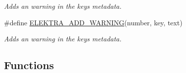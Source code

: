\begin{DoxyCompactItemize}
\begin{DoxyCompactList}\small\item\em Adds an warning in the keys metadata. \end{DoxyCompactList}\item 
\#define \hyperlink{group__plugin_ga3da3bdb0f41710adda9eee3d7adac9ff}{E\+L\+E\+K\+T\+R\+A\+\_\+\+A\+D\+D\+\_\+\+W\+A\+R\+N\+I\+N\+G}(number, key, text)
\begin{DoxyCompactList}\small\item\em Adds an warning in the keys metadata. \end{DoxyCompactList}\end{DoxyCompactItemize}
\subsection*{Functions}
